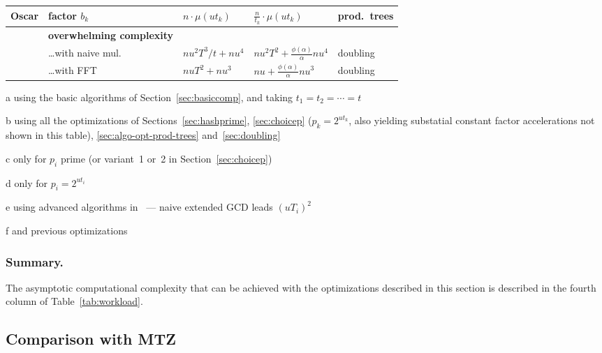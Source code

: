 \documentclass[twoside,envcountsame,runningheads]{llncs}
\begin{document}
\begin{table}[t]
\begin{threeparttable}
\begin{tabularx}{\textwidth}{lXC{2.3cm}C{2.5cm}l}
Oscar & factor $b_k$
      & $n \cdot \mu(ut_k)$ 
      & $\frac{n}{t_k} \cdot \mu(ut_k)$
      & prod.\ trees%
 \\
\midrule
      & \textbf{overwhelming complexity}
      & %
      & %
      & %
 \\
      & \dots with naive mul.
      & $n u^2 T^3 / t + n u^4$
      & $n u^2 T^2 + \frac{\phi(\alpha)}{\alpha} n u^4$
      & doubling \\
      & \dots with FFT
      & $n u T^2 + n u^3$
      & $n u + \frac{\phi(\alpha)}{\alpha} n u^3$
      & doubling \\
\bottomrule
  \end{tabularx}
  \begin{tablenotes}
    \scriptsize
    \item[a] using the basic algorithms of Section~\ref{sec:basiccomp}, and taking $t_1=t_2=\cdots=t$
    \item[b] using all the optimizations of Sections~\ref{sec:hashprime}, \ref{sec:choicep} ($p_k = 2^{ut_k}$, also yielding substatial constant factor accelerations not shown in this table), \ref{sec:algo-opt-prod-trees} and~\ref{sec:doubling}
    \item[c] only for $p_i$ prime (or variant~1 or~2 in Section~\ref{sec:choicep})
    \item[d] only for $p_i = 2^{ut_i}$
    \item[e] using advanced algorithms in~\cite{pan2004rational,wang2003acceleration} --- naive extended GCD leads $(uT_i)^2$
    \item[f] and previous optimizations\smallskip
  \end{tablenotes}
 \end{threeparttable}
\end{table}

\subsubsection{Summary.}

The asymptotic computational complexity that can be achieved with the optimizations described in this section is described in the fourth column of Table~\ref{tab:workload}.

\subsection{Comparison with MTZ}\label{sec:opt-MTZ}
\end{document}
